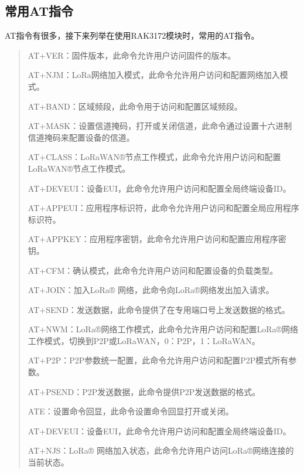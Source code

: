 \documentclass[a4paper,12pt,english]{sphinxmanual}
\begin{document}
{{\sphinxAtStartPar
{}


\subsection{常用AT指令}
\label{\detokenize{exp-lora/at-command:at}}
\sphinxAtStartPar
AT指令有很多，接下来列举在使用RAK3172模块时，常用的AT指令。
\begin{quote}

\sphinxAtStartPar
AT+VER：固件版本，此命令允许用户访问固件的版本。

\sphinxAtStartPar
AT+NJM：LoRa网络加入模式，此命令允许用户访问和配置网络加入模式。

\sphinxAtStartPar
AT+BAND：区域频段，此命令用于访问和配置区域频段。

\sphinxAtStartPar
AT+MASK：设置信道掩码，打开或关闭信道，此命令通过设置十六进制信道掩码来配置设备的信道。

\sphinxAtStartPar
AT+CLASS：LoRaWAN®节点工作模式，此命令允许用户访问和配置LoRaWAN®节点工作模式。

\sphinxAtStartPar
AT+DEVEUI：设备EUI，此命令允许用户访问和配置全局终端设备ID。

\sphinxAtStartPar
AT+APPEUI：应用程序标识符，此命令允许用户访问和配置全局应用程序标识符。

\sphinxAtStartPar
AT+APPKEY：应用程序密钥，此命令允许用户访问和配置应用程序密钥。

\sphinxAtStartPar
AT+CFM：确认模式，此命令允许用户访问和配置设备的负载类型。

\sphinxAtStartPar
AT+JOIN：加入LoRa® 网络，此命令向LoRa®网络发出加入请求。

\sphinxAtStartPar
AT+SEND：发送数据，此命令提供了在专用端口号上发送数据的格式。

\sphinxAtStartPar
AT+NWM：LoRa®网络工作模式，此命令允许用户访问和配置LoRa®网络工作模式，切换到P2P或LoRaWAN，0：P2P，1：LoRaWAN。

\sphinxAtStartPar
AT+P2P：P2P参数统一配置，此命令允许用户访问和配置P2P模式所有参数。

\sphinxAtStartPar
AT+PSEND：P2P发送数据，此命令提供P2P发送数据的格式。

\sphinxAtStartPar
ATE：设置命令回显，此命令设置命令回显打开或关闭。

\sphinxAtStartPar
AT+DEVEUI：设备EUI，此命令允许用户访问和配置全局终端设备ID。

\sphinxAtStartPar
AT+NJS：LoRa® 网络加入状态，此命令允许用户访问LoRa®网络连接的当前状态。
\end{quote}

}}
\end{document}
